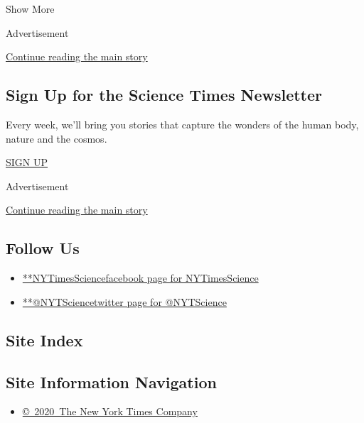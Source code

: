 Show More

Advertisement

\protect\hyperlink{after-mid2}{Continue reading the main story}

\hypertarget{sign-up-for-the-science-times-newsletter}{%
\subsection{Sign Up for the Science Times
Newsletter}\label{sign-up-for-the-science-times-newsletter}}

Every week, we'll bring you stories that capture the wonders of the
human body, nature and the cosmos.

\href{/newsletters/signup/SC}{SIGN UP}

Advertisement

\protect\hyperlink{after-mktg}{Continue reading the main story}

\hypertarget{follow-us}{%
\subsection{Follow Us}\label{follow-us}}

\begin{itemize}
\tightlist
\item
  \href{https://www.facebookcorewwwi.onion/NYTimesScience}{**NYTimesSciencefacebook
  page for NYTimesScience}
\item
  \href{https://twitter.com/NYTScience}{**@NYTSciencetwitter page for
  @NYTScience}
\end{itemize}

\hypertarget{site-index}{%
\subsection{Site Index}\label{site-index}}

\hypertarget{site-information-navigation}{%
\subsection{Site Information
Navigation}\label{site-information-navigation}}

\begin{itemize}
\tightlist
\item
  \href{https://help.nytimes3xbfgragh.onion/hc/en-us/articles/115014792127-Copyright-notice}{©~2020~The
  New York Times Company}
\end{itemize}

